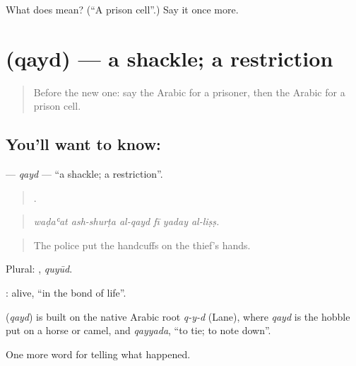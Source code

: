 \begin{tcolorbox}[breakable,colback=teal!4,colframe=teal!35!black,title={Before you move on}]
What does  mean? (\textquotedblleft{}A prison cell\textquotedblright{}.) Say it once more.
\end{tcolorbox}
\section[\texorpdfstring{\ar{قيد} (qayd)}{قيد (qayd)}]{ (qayd) — a shackle; a restriction}

\label{lesson:AR-C330-qayd}



\begin{quote}
Before the new one: say the Arabic for a prisoner, then the Arabic for a prison cell.
\end{quote}

\subsection*{You'll want to know: }
\textbf{} — \emph{qayd} — \textquotedblleft{}a shackle; a restriction\textquotedblright{}.

\begin{quote}
     .
\end{quote}

\begin{quote}
\emph{waḍaʿat ash-shurṭa al-qayd fī yaday al-liṣṣ.}
\end{quote}

\begin{quote}
The police put the handcuffs on the thief’s hands.
\end{quote}

Plural: , \emph{quyūd}.

  : alive, \textquotedblleft{}in the bond of life\textquotedblright{}.

\begin{cousinweb}
\textbf{} (\emph{qayd}) is built on the native Arabic root \emph{q-y-d} (Lane), where \emph{qayd} is the hobble put on a horse or camel, and \emph{qayyada}, \textquotedblleft{}to tie; to note down\textquotedblright{}.
\end{cousinweb}

\begin{grammarlens}[title={What you've built}]
One more word for telling what happened.
\end{grammarlens}

